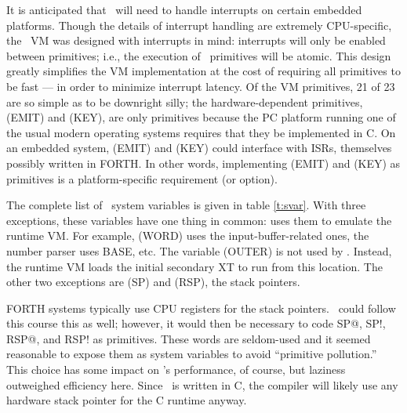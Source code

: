 \documentclass{article}
\begin{document}
It is anticipated that \M\ will need to handle interrupts on certain
embedded platforms. Though the details of interrupt handling are
extremely CPU-specific, the \M\ VM was designed with interrupts in
mind: interrupts will only be enabled between primitives; i.e., the
execution of \M\ primitives will be atomic. This design greatly
simplifies the VM implementation at the cost of requiring all
primitives to be fast --- in order to minimize interrupt latency. Of
the VM primitives, 21 of 23 are so simple as to be downright silly;
the hardware-dependent primitives, (EMIT) and (KEY), are only
primitives because the PC platform running one of the usual modern
operating systems requires that they be implemented in C. On an
embedded system, (EMIT) and (KEY) could interface with ISRs,
themselves possibly written in FORTH. In other words, implementing
(EMIT) and (KEY) as primitives is a platform-specific requirement (or
option).

The complete list of \M\ system variables is given in table
\ref{t:svar}. With three exceptions, these variables have one thing
in common:  uses them to emulate the runtime VM. For
example, (WORD) uses the input-buffer-related ones, the number
parser uses BASE, etc. The variable (OUTER) is not used by
. Instead, the runtime VM  loads the
initial secondary XT to run from this location. The other two
exceptions are (SP) and (RSP), the stack pointers.

FORTH systems typically use CPU registers for the stack pointers. \M\
could follow this course this as well; however, it would then be
necessary to code SP@, SP!, RSP@, and RSP! as primitives. These words
are seldom-used and it seemed reasonable to expose them as system
variables to avoid ``primitive pollution.'' This choice has some
impact on \M's performance, of course, but laziness outweighed
efficiency here. Since \M\ is written in C, the compiler will likely
use any hardware stack pointer for the C runtime anyway.
\end{document}

